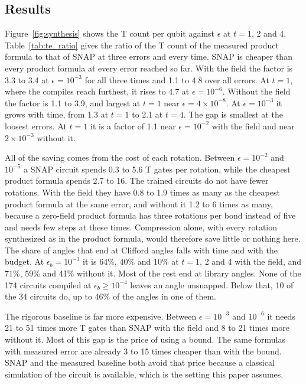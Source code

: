 \subsection{Results}
\label{sec:time_evolution_results}

Figure~\ref{fig:synthesis} shows the T count per qubit against $\epsilon$ at $t = 1$, 2 and 4. Table~\ref{tab:te_ratio} gives the ratio of the T count of the measured product formula to that of SNAP at three errors and every time. SNAP is cheaper than every product formula at every error reached so far. With the field the factor is 3.3 to 3.4 at $\epsilon = 10^{-3}$ for all three times and 1.1 to 4.8 over all errors. At $t = 1$, where the compiles reach furthest, it rises to 4.7 at $\epsilon = 10^{-6}$. Without the field the factor is 1.1 to 3.9, and largest at $t = 1$ near $\epsilon = 4 \times 10^{-8}$. At $\epsilon = 10^{-3}$ it grows with time, from 1.3 at $t = 1$ to 2.1 at $t = 4$. The gap is smallest at the loosest errors. At $t = 1$ it is a factor of 1.1 near $\epsilon = 10^{-2}$ with the field and near $2 \times 10^{-3}$ without it.

All of the saving comes from the cost of each rotation. Between $\epsilon = 10^{-2}$ and $10^{-5}$ a SNAP circuit spends 0.3 to 5.6 T gates per rotation, while the cheapest product formula spends 2.7 to 16. The trained circuits do not have fewer rotations. With the field they have 0.8 to 1.9 times as many as the cheapest product formula at the same error, and without it 1.2 to 6 times as many, because a zero-field product formula has three rotations per bond instead of five and needs few steps at these times. Compression alone, with every rotation synthesized as in the product formula, would therefore save little or nothing here.  The share of angles that end at Clifford angles falls with time and with the budget. At $\epsilon_b = 10^{-3}$ it is 64\%, 40\% and 10\% at $t = 1$, 2 and 4 with the field, and 71\%, 59\% and 41\% without it. Most of the rest end at library angles. None of the 174 circuits compiled at $\epsilon_b \geq 10^{-4}$ leaves an angle unsnapped. Below that, 10 of the 34 circuits do, up to 46\% of the angles in one of them.

The rigorous baseline is far more expensive. Between $\epsilon = 10^{-3}$ and $10^{-6}$ it needs 21 to 51 times more T gates than SNAP with the field and 8 to 21 times more without it. Most of this gap is the price of using a bound. The same formulas with measured error are already 3 to 15 times cheaper than with the bound. SNAP and the measured baseline both avoid that price because a classical simulation of the circuit is available, which is the setting this paper assumes.

